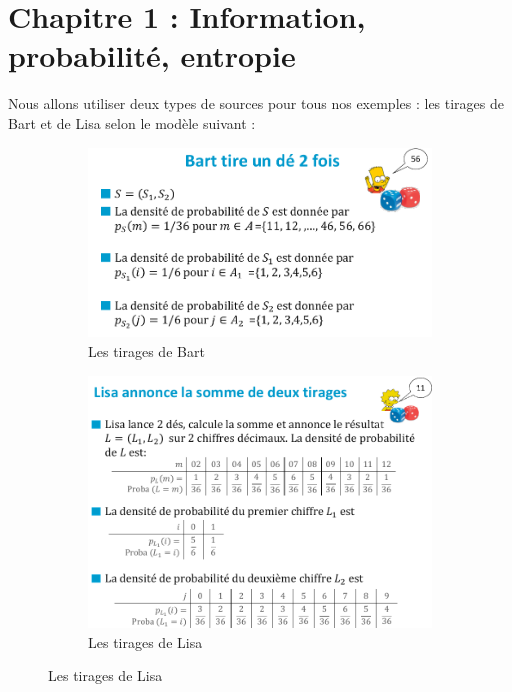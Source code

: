 \documentclass[11pt,a4paper]{article}
\begin{document}
\section[Information, probabilité, entropie]{Chapitre 1 : Information, probabilité, entropie}
\begin{exemple}
	Nous allons utiliser deux types de sources pour tous nos exemples : les tirages de Bart et de Lisa selon le modèle suivant :
\end{exemple}
\begin{figure}[!h]
	\centering
	\begin{subfigure}{.46\linewidth}
		\centering
		\includegraphics[scale=0.4]{images/bart}
		\caption{Les tirages de Bart}
		\label{bart}
	\end{subfigure}
	\begin{subfigure}{.46\linewidth}
		\centering
		\includegraphics[scale=0.4]{images/lisa}
		\caption{Les tirages de Lisa}
		\label{lisa}
	\end{subfigure}
\end{figure}
\end{document}
